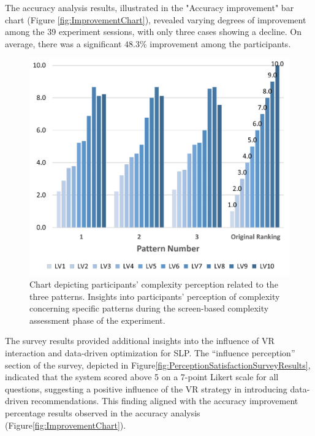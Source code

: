 The accuracy analysis results, illustrated in the "Accuracy improvement" bar chart (Figure \ref{fig:ImprovementChart}), revealed varying degrees of improvement among the 39 experiment sessions, with only three cases showing a decline.
On average, there was a significant \(48.3\%\) improvement among the participants.

    \begin{figure}[htb]
        \centering
        \includegraphics[width=\linewidth]{Images/ComplexityPerceptionChart}
        \caption{Chart depicting participants' complexity perception related to the three patterns. Insights into participants' perception of complexity concerning specific patterns during the screen-based complexity assessment phase of the experiment.}
        \label{fig:ComplexityPerceptionChart}
    \end{figure}


The survey results provided additional insights into the influence of VR interaction and data-driven optimization for SLP. The ``influence perception'' section of the survey, depicted in Figure\ref{fig:PerceptionSatisfactionSurveyResults}, indicated that the system scored above 5 on a 7-point Likert scale for all questions, suggesting a positive influence of the VR strategy in introducing data-driven recommendations.
This finding aligned with the accuracy improvement percentage results observed in the accuracy analysis (Figure\ref{fig:ImprovementChart}).



